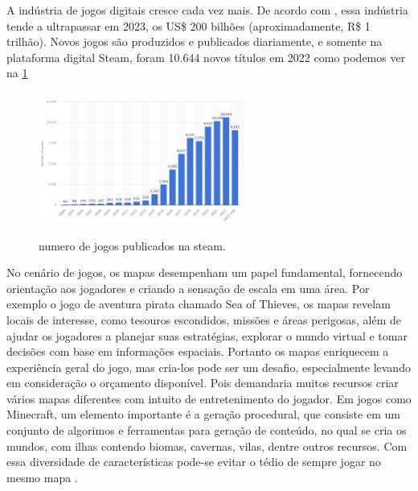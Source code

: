 A indústria de jogos digitais cresce cada vez mais. De acordo com \space{}, essa indústria tende a ultrapassar em 2023, os US\$ 200 bilhões (aproximadamente, R\$ 1 trilhão). Novos jogos são produzidos e publicados diariamente, e somente na plataforma digital Steam, foram 10.644 novos títulos em 2022 como podemos ver na \cref{fig:steam_publishes} \space

\begin{figure}[!ht]
	\centering
    \caption{numero de jogos publicados na steam.}
	\includegraphics[width=0.6\textwidth]{figures/steam_sales.png}
	\label{fig:steam_publishes}
\end{figure}


No cenário de jogos, os mapas desempenham um papel fundamental, fornecendo orientação aos jogadores e criando a sensação de escala em uma área. Por exemplo o jogo de aventura pirata chamado Sea of Thieves, os mapas revelam locais de interesse, como tesouros escondidos, missões e áreas perigosas, além de ajudar os jogadores a planejar suas estratégias, explorar o mundo virtual e tomar decisões com base em informações espaciais. Portanto os mapas enriquecem a experiência geral do jogo, mas cria-los pode ser um desafio, especialmente levando em consideração o orçamento disponível. Pois demandaria muitos recursos criar vários mapas diferentes com intuito de entretenimento do jogador. Em jogos como Minecraft, um elemento importante é a geração procedural, que consiste em um conjunto de algorimos e ferramentas para geração de conteúdo, no qual se cria os mundos, com ilhas contendo biomas, cavernas, vilas, dentre outros recursos. Com essa diversidade de características pode-se evitar o tédio de sempre jogar no mesmo mapa \space\cite{video-game-maps, lecafedugeek}.

